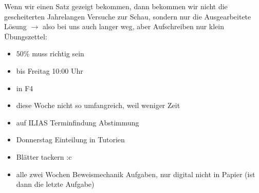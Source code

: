 \documentclass[consecutivenumbering]{gadsescript}
\begin{document}
Wenn wir einen Satz gezeigt bekommen, dann bekommen wir nicht die gescheiterten Jahrelangen Versuche zur Schau, sondern nur die Ausgearbeitete Lösung $\rightarrow$ also bei uns auch langer weg, aber Aufschreiben nur klein\\

Übungszettel:
\begin{itemize}
	\item $ 50\% $ muss richtig sein
	\item bis Freitag 10:00 Uhr
	\item in F4
	\item diese Woche nicht so umfangreich, weil weniger Zeit
	\item auf ILIAS Terminfindung Abstimmung
	\item Donnerstag Einteilung in Tutorien
	\item Blätter tackern :c
	\item alle zwei Wochen Beweismechanik Aufgaben, nur digital nicht in Papier (ist dann die letzte Aufgabe)
\end{itemize}
\end{document}
